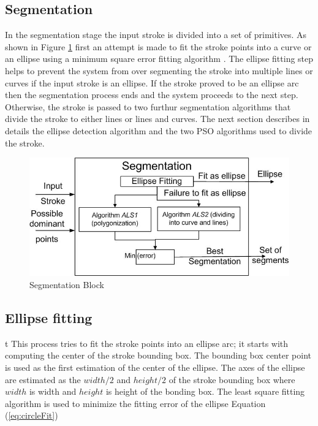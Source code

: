 \documentclass{article}
\begin{document}
\subsection{Segmentation}
\label{seg}
In the segmentation stage the input stroke is divided into a set of primitives. As shown in Figure \ref{fig:segblock} first an attempt is made to fit the stroke points into a curve or an ellipse using a minimum square error fitting algorithm \cite{chernov-2003}. The ellipse fitting step helps to prevent the system from over segmenting the stroke into multiple lines or curves if the input stroke is an ellipse. If the stroke proved to be an ellipse arc then the segmentation process ends and the system proceeds to the next step. Otherwise, the stroke is passed to two furthur segmentation algorithms that divide the stroke to either lines or lines and curves. The next section describes in details the ellipse detection algorithm and the two PSO algorithms used to divide the stroke. %

 \begin{figure}
	\centering
		\includegraphics[scale=0.5]{images/blockSmall.jpg}
	\caption{Segmentation Block}
	\label{fig:segblock}
\end{figure}
\subsection{Ellipse fitting} 
t
This process tries to fit the stroke points into an ellipse arc; it starts with computing the center of the stroke bounding box. The bounding box center point is used as the first estimation of the center of the ellipse. The axes of the ellipse are estimated as the $width/2$ and $height/2$ of the stroke bounding box where $width$ is width and $height$ is height of the bonding box. The least square fitting algorithm \cite{chernov-2003} is used to minimize the fitting error of the ellipse Equation (\ref{eq:circleFit})  
\end{document}
